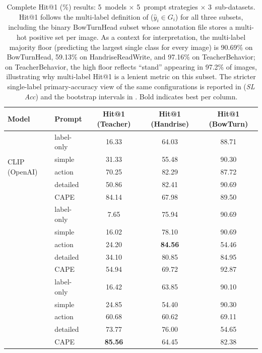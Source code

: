 \documentclass[symmetry,article,submit,pdftex,moreauthors]{Definitions/mdpi}
\begin{document}
\begin{table}[H]
\caption{Complete Hit@1 (\%) results: 5~models $\times$ 5~prompt strategies $\times$ 3~sub-datasets. Hit@1 follows the multi-label definition of  ($\hat{y}_i \in G_i$) for all three subsets, including the binary BowTurnHead subset whose annotation file stores a multi-hot positive set per image. As a context for interpretation, the multi-label majority floor (predicting the largest single class for every image) is 90.69\% on BowTurnHead, 59.13\% on HandriseReadWrite, and 97.16\% on TeacherBehavior; on TeacherBehavior, the high floor reflects ``stand'' appearing in 97.2\% of images, illustrating why multi-label Hit@1 is a lenient metric on this subset. The stricter single-label primary-accuracy view of the same configurations is reported in  (\textit{SL Acc}) and the bootstrap intervals in . Bold indicates best per column.}
\label{tab:main_results}
\centering
\small
\setlength{\tabcolsep}{4pt}
\begin{tabular}{ll ccc}
\toprule
\textbf{Model} & \textbf{Prompt} & \textbf{Hit@1 (Teacher)} & \textbf{Hit@1 (Handrise)} & \textbf{Hit@1 (BowTurn)} \\
\midrule
\multirow{5}{*}{CLIP (OpenAI)}
 & label-only & 16.33 & 64.03 & 88.71 \\
 & simple & 31.33 & 55.48 & 90.30 \\
 & action & 70.25 & 82.29 & 87.72 \\
 & detailed & 50.86 & 82.41 & 90.69 \\
 & CAPE & 84.14 & 67.98 & 89.50 \\
\addlinespace
\multirow{5}{*}{OpenCLIP (LAION)}
 & label-only & 7.65 & 75.94 & 90.69 \\
 & simple & 16.02 & 78.10 & 90.69 \\
 & action & 24.20 & \textbf{84.56} & 54.46\rlap{$^{\ddagger}$} \\
 & detailed & 34.10 & 80.85 & 84.95 \\
 & CAPE & 54.94 & 69.72 & 92.87 \\
\addlinespace
\multirow{5}{*}{SigLIP2}
 & label-only & 16.42\rlap{$^{\S}$} & 63.85 & 90.10 \\
 & simple & 24.85 & 54.40 & 90.30 \\
 & action & 60.68 & 60.62 & 69.11 \\
 & detailed & 73.77 & 76.00 & 54.65 \\
 & CAPE & \textbf{85.56} & 64.45 & 82.38 \\

\end{tabular}
\end{table}
\end{document}
